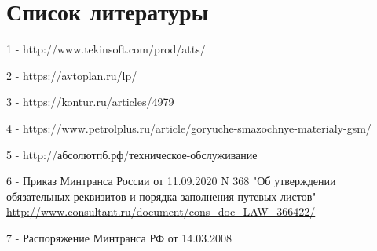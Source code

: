 \documentclass[./nirs.tex]{subfiles}
\begin{document}
\section*{Список литературы}
	1 - http://www.tekinsoft.com/prod/atts/

	2 - https://avtoplan.ru/lp/

	3 - https://kontur.ru/articles/4979

	4 - https://www.petrolplus.ru/article/goryuche-smazochnye-materialy-gsm/

	5 - http://абсолютпб.рф/техническое-обслуживание

	6 - Приказ Минтранса России от 11.09.2020 N 368 "Об утверждении обязательных
	реквизитов и порядка заполнения путевых листов"\\
	\url{http://www.consultant.ru/document/cons_doc_LAW_366422/}

	7 - Распоряжение Минтранса РФ от 14.03.2008 
\end{document}
